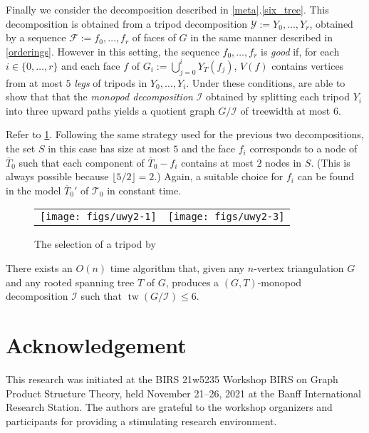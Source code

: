 \documentclass{patmorin}
\DeclareMathOperator{\tw}{tw}
\begin{document}
Finally we consider the decomposition described in \cref{meta}.\ref{six_tree}.   This decomposition is obtained from a tripod decomposition $\mathcal{Y}:=Y_0,\ldots,Y_r$, obtained by a sequence $\mathcal{F}:=f_0,\ldots,f_r$ of faces of $G$ in the same manner described in \cref{orderings}.  However in this setting, the sequence $f_0,\ldots,f_r$ is \emph{good} if, for each $i\in\{0,\ldots,r\}$ and each face $f$ of $G_i:=\bigcup_{j=0}^i Y_T(f_j)$, $V(f)$ contains vertices from at most $5$ \emph{legs} of tripods in $Y_{0},\ldots,Y_i$.  Under these conditions, \citet{ueckerdt.wood.ea:improved} are able to show that that the \emph{monopod decomposition} $\mathcal{I}$ obtained by splitting each tripod $Y_i$ into three upward paths yields a quotient graph $G/\mathcal{I}$ of treewidth at most $6$.

Refer to \cref{uwy}. Following the same strategy used for the previous two decompositions, the set $S$ in this case has size at most $5$ and the face $f_i$ corresponds to a node of $\overline{T}_0$ such that each component of $\overline{T}_0-f_i$ contains at most $2$ nodes in $S$.  (This is always possible because $\lfloor 5/2\rfloor=2$.)  Again, a suitable choice for $f_i$ can be found in the model $\overline{T}_0'$ of $\mathcal{T}_0$ in constant time.

\begin{figure}[htbp]
  \begin{center}
    \begin{tabular}{cc}
       \texttt{[image: figs/uwy2-1]} &
       \texttt{[image: figs/uwy2-3]}
     \end{tabular}
  \end{center}
  \caption{The selection of a tripod by \citet{ueckerdt.wood.ea:improved}}
  \label{uwy}
\end{figure}


\begin{thm}\label{monopod_decomposition_algorithm}
  There exists an $O(n)$ time algorithm that, given any $n$-vertex triangulation $G$ and any rooted spanning tree $T$ of $G$, produces a $(G,T)$-monopod decomposition $\mathcal{I}$ such that $\tw(G/\mathcal{I})\le 6$.
\end{thm}


\section*{Acknowledgement}

This research was initiated at the BIRS 21w5235 Workshop BIRS on Graph Product Structure Theory, held November 21--26, 2021 at the Banff International Research Station.  The authors are grateful to the workshop organizers and participants for providing a stimulating research environment.




\end{document}
